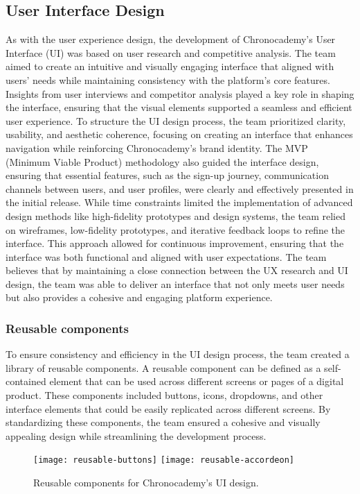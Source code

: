 \subsection{User Interface Design}\label{subsec:user-interface-design}
As with the user experience design, the development of Chronocademy’s User Interface (UI) was based on user research and competitive analysis.
The team aimed to create an intuitive and visually engaging interface that aligned with users’ needs while maintaining consistency with the platform’s core features.
Insights from user interviews and competitor analysis played a key role in shaping the interface, ensuring that the visual elements supported a seamless and efficient user experience.\newline
To structure the UI design process, the team prioritized clarity, usability, and aesthetic coherence, focusing on creating an interface that enhances navigation while reinforcing Chronocademy’s brand identity.
The MVP (Minimum Viable Product) methodology also guided the interface design, ensuring that essential features, such as the sign-up journey, communication channels between users, and user profiles, were clearly and effectively presented in the initial release.\newline
While time constraints limited the implementation of advanced design methods like high-fidelity prototypes and design systems, the team relied on wireframes, low-fidelity prototypes, and iterative feedback loops to refine the interface.
This approach allowed for continuous improvement, ensuring that the interface was both functional and aligned with user expectations.
The team believes that by maintaining a close connection between the UX research and UI design, the team was able to deliver an interface that not only meets user needs but also provides a cohesive and engaging platform experience.

\subsubsection{Reusable components}\label{subsubsec:rereusable-components}
To ensure consistency and efficiency in the UI design process, the team created a library of reusable components.
A reusable component can be defined as a self-contained element that can be used across different screens or pages of a digital product.
These components included buttons, icons, dropdowns, and other interface elements that could be easily replicated across different screens.
By standardizing these components, the team ensured a cohesive and visually appealing design while streamlining the development process.

\begin{figure}[h]
    \centering
    \texttt{[image: reusable-buttons]}
    \texttt{[image: reusable-accordeon]}
    \caption{Reusable components for Chronocademy's UI design.}\label{fig:figure7}
\end{figure}